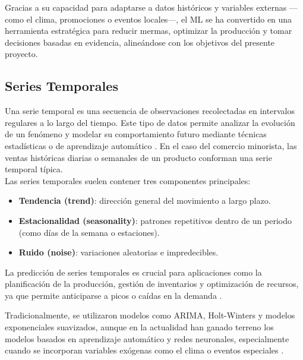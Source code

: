 Gracias a su capacidad para adaptarse a datos históricos y variables externas —como el clima, promociones o eventos locales—, el ML se ha convertido en una herramienta estratégica para reducir mermas, optimizar la producción y tomar decisiones basadas en evidencia, alineándose con los objetivos del presente proyecto.

\subsection{Series Temporales}

Una serie temporal es una secuencia de observaciones recolectadas en intervalos regulares a lo largo del tiempo. Este tipo de datos permite analizar la evolución de un fenómeno y modelar su comportamiento futuro mediante técnicas estadísticas o de aprendizaje automático \parencite{chatfield2004}. En el caso del comercio minorista, las ventas históricas diarias o semanales de un producto conforman una serie temporal típica.\\

Las series temporales suelen contener tres componentes principales:

\begin{itemize}
    \item \textbf{Tendencia (trend)}: dirección general del movimiento a largo plazo.
    
    \item \textbf{Estacionalidad (seasonality)}: patrones repetitivos dentro de un periodo (como días de la semana o estaciones).
    
    \item \textbf{Ruido (noise)}: variaciones aleatorias e impredecibles.
\end{itemize}

La predicción de series temporales es crucial para aplicaciones como la planificación de la producción, gestión de inventarios y optimización de recursos, ya que permite anticiparse a picos o caídas en la demanda \parencite{hyndman2018}.

Tradicionalmente, se utilizaron modelos como ARIMA, Holt-Winters y modelos exponenciales suavizados, aunque en la actualidad han ganado terreno los modelos basados en aprendizaje automático y redes neuronales, especialmente cuando se incorporan variables exógenas como el clima o eventos especiales \parencite{bandara2020}.

